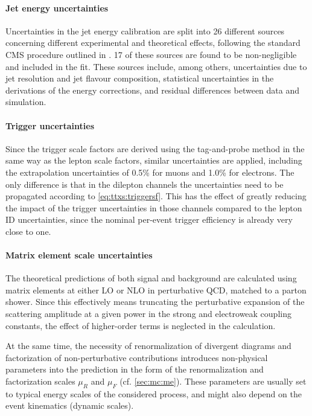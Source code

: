 \paragraph{Jet energy uncertainties}

Uncertainties in the jet energy calibration are split into 26 different sources concerning different experimental and theoretical effects, following the standard CMS procedure outlined in . 17 of these sources are found to be non-negligible and included in the fit. These sources include, among others, uncertainties due to jet \pt resolution and jet flavour composition, statistical uncertainties in the derivations of the energy corrections, and residual differences between data and simulation.

\paragraph{Trigger uncertainties}

Since the trigger scale factors are derived using the tag-and-probe method in the same way as the lepton scale factors, similar uncertainties are applied, including the extrapolation uncertainties of 0.5\% for muons and 1.0\% for electrons. The only difference is that in the dilepton channels the uncertainties need to be propagated according to \cref{eq:ttxs:triggersf}. This has the effect of greatly reducing the impact of the trigger uncertainties in those channels compared to the lepton ID uncertainties, since the nominal per-event trigger efficiency is already very close to one.

\paragraph{Matrix element scale uncertainties}

The theoretical predictions of both signal and background are calculated using matrix elements at either LO or NLO in perturbative QCD, matched to a parton shower. Since this effectively means truncating the perturbative expansion of the scattering amplitude at a given power in the strong and electroweak coupling constants, the effect of higher-order terms is neglected in the calculation.

At the same time, the necessity of renormalization of divergent diagrams and factorization of non-perturbative contributions introduces non-physical parameters into the prediction in the form of the renormalization and factorization scales $\mu_R$ and $\mu_F$ (cf. \cref{sec:mc:me}). These parameters are usually set to typical energy scales of the considered process, and might also depend on the event kinematics (dynamic scales).

